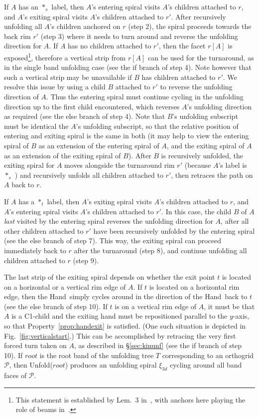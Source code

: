 \documentclass[11pt]{article}
\def\P{{\mathcal P}}
\newcommand\hand{{\sc Hand}}
\newcommand\unfoldrims{{\sc Unfold}}
\begin{document}
If $A$ has an $*_s$ label, then $A$'s entering spiral visits $A$'s children attached to $r$, and $A$'s exiting spiral visits $A$'s children attached to $r'$. After recursively unfolding all $A$'s children anchored on $r$ (step 2), the spiral proceeds towards the back rim $r'$ (step 3) where it needs to turn around and reverse the unfolding direction for $A$. If $A$ has no children attached to $r'$, then the facet $r[A]$ is exposed\footnote{This statement is established by Lem.~3 in~\cite{Damian-Flatland-O'Rourke-2007-epsilon}, with anchors here playing the role of beams in~\cite{Damian-Flatland-O'Rourke-2007-epsilon}.}, therefore a vertical strip from $r[A]$ can be used for the turnaround, as in the single band unfolding case (see the if branch of step 4). Note however that such a vertical strip may be unavailable if $B$ has children attached to $r'$. We resolve this issue by using a child $B$ attached to $r'$ to reverse the unfolding direction of $A$. Thus the entering spiral must continue cycling in the unfolding direction up to the first child encountered, which reverses $A$'s unfolding direction as required (see the else branch of step 4). Note that $B$'s unfolding subscript must be identical the $A$'s unfolding subscript, so that the relative position of entering and exiting spiral is the same in both (it may help to view the entering spiral of $B$ as an extension of the entering spiral of $A$, and the exiting spiral of $A$ as an extension of the exiting spiral of $B$). After $B$ is recursively unfolded, the exiting spiral for $A$ moves alongside the turnaround rim $r'$ (because $A$'s label is $*_s$ ) and recursively unfolds all children attached to $r'$,  then retraces the path on $A$ back to $r$.

If $A$ has a $*_t$ label, then $A$'s exiting spiral visits $A$'s children attached to $r$, and $A$'s entering spiral visits $A$'s children attached to $r'$. In this case, the child $B$ of $A$ \emph{last} visited by the entering spiral reverses the unfolding direction for $A$, after all other children attached to $r'$ have been recursively unfolded by the entering spiral (see the else branch of step 7). This way, the exiting spiral can proceed immediately back to $r$ after the turnaround (step 8), and continue unfolding all children attached to $r$ (step 9). 

The last strip of the exiting spiral depends on whether the exit point $t$ is located on a horizontal or a vertical rim edge of $A$. If $t$ is located on a horizontal rim edge, then the \hand\ simply cycles around in the direction of the \hand\ back to $t$ (see the else branch of step 10). If $t$ is on a vertical rim edge of $A$, it must be that $A$ is a C1-child and the exiting hand must be repositioned parallel to the $y$-axis, so that Property~\ref{prop:handexit} is satisfied.  (One such situation is depicted in Fig.~\ref{fig:verticalstart}.) This can be accomplished by retracing the very first forced turn taken on $A$, as described in \S\ref{sec:kinunf} (see the if branch of step 10). 
If $root$ is the root band of the unfolding tree $T$ corresponding to an orthogrid $\P$, then \unfoldrims($root$) produces an unfolding spiral $\xi_{3d}$ cycling around all band faces of $\P$. 
\end{document}
